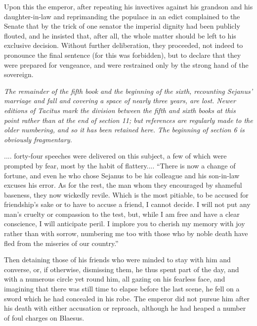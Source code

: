 
Upon this the emperor, after repeating his invectives against his grandson and his daughter-in-law and reprimanding the populace in an edict complained to the Senate that by the trick of one senator the imperial dignity had been publicly flouted, and he insisted that, after all, the whole matter should be left to his exclusive decision. Without further deliberation, they proceeded, not indeed to pronounce the final sentence (for this was forbidden), but to declare that they were prepared for vengeance, and were restrained only by the strong hand of the sovereign.

\emph{The remainder of the fifth book and the beginning of the sixth, recounting Sejanus' marriage and fall and covering a space of nearly three years, are lost. Newer editions of Tacitus mark the division between the fifth and sixth books at this point rather than at the end of section 11; but references are regularly made to the older numbering, and so it has been retained here. The beginning of section 6 is obviously fragmentary.}


.... forty-four speeches were delivered on this subject, a few of which were prompted by fear, most by the habit of flattery.... ``There is now a change of fortune, and even he who chose Sejanus to be his colleague and his son-in-law excuses his error. As for the rest, the man whom they encouraged by shameful baseness, they now wickedly revile. Which is the most pitiable, to be accused for friendship's sake or to have to accuse a friend, I cannot decide. I will not put any man's cruelty or compassion to the test, but, while I am free and have a clear conscience, I will anticipate peril. I implore you to cherish my memory with joy rather than with sorrow, numbering me too with those who by noble death have fled from the miseries of our country.''


Then detaining those of his friends who were minded to stay with him and converse, or, if otherwise, dismissing them, he thus spent part of the day, and with a numerous circle yet round him, all gazing on his fearless face, and imagining that there was still time to elapse before the last scene, he fell on a sword which he had concealed in his robe. The emperor did not pursue him after his death with either accusation or reproach, although he had heaped a number of foul charges on Blaesus.


